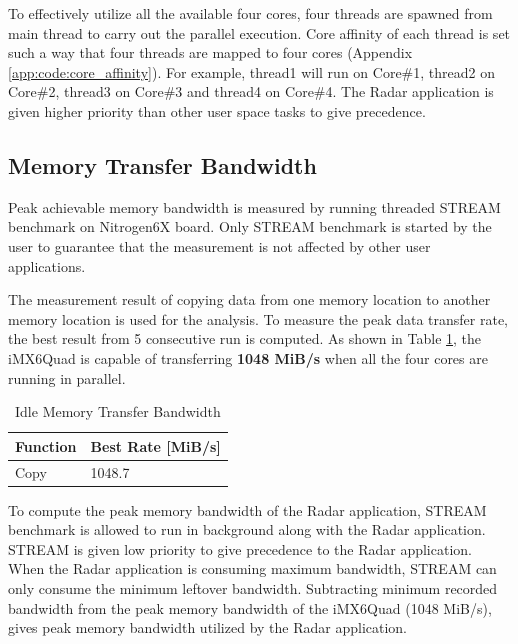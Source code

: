 To effectively utilize all the available four cores, four threads are spawned from main thread to carry out the parallel execution. Core affinity of each thread is set such a way that four threads are mapped to four cores (Appendix \ref{app:code:core_affinity}). For example, thread1 will run on Core\#1, thread2 on Core\#2, thread3 on Core\#3 and thread4 on Core\#4. The Radar application is given higher priority than other user space tasks to give precedence. 

\subsection{Memory Transfer Bandwidth}
\label{ss:mm:mem_bw}
Peak achievable memory bandwidth is measured by running threaded STREAM benchmark on Nitrogen6X board. Only STREAM benchmark is started by the user to guarantee that the measurement is not affected by other user applications. 


The measurement result of copying data from one memory location to another memory location is used for the  analysis. To measure the peak data transfer rate, the best result from 5 consecutive run is computed. As shown in Table \ref{tbl:mm:bw_no_load}, the iMX6Quad is capable of transferring \textbf{1048 MiB/s} when all the four cores are running in parallel.\\

\begin{table}[h!]
	\centering
	\begin{tabular}{|l|l|} 
	 \hline
	 \textbf{Function} & \textbf{Best Rate [MiB/s]}  \\
	 \hline
	 Copy & 1048.7 \\ \hline
	\end{tabular}
	\caption{Idle Memory Transfer Bandwidth}
	\label{tbl:mm:bw_no_load}
\end{table}

To compute the peak memory bandwidth of the Radar application, STREAM benchmark is allowed to run in background along with the Radar application. STREAM is given low priority to give precedence to the Radar application. When the Radar application is consuming maximum bandwidth, STREAM can only consume the minimum leftover bandwidth. Subtracting minimum recorded bandwidth from the peak memory bandwidth of the iMX6Quad (1048 MiB/s), gives peak memory bandwidth utilized by the Radar application.

